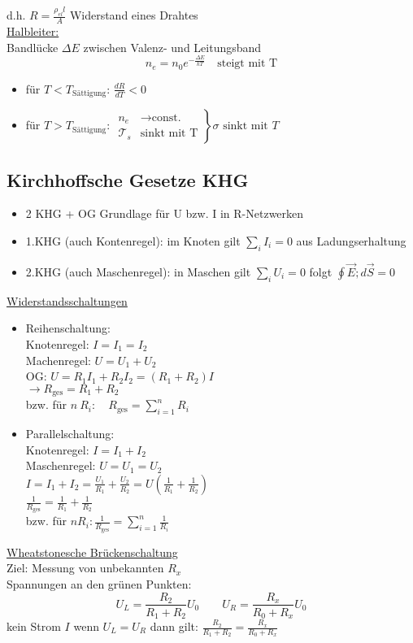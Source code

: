 \documentclass[titlepage,12pt,a4paper,ngerman]{report}
\newcommand{\tx}[1]{\textrm{#1}}
\begin{document}

d.h. $\boxed{ R = \frac{\rho_{el} l}{A}}$ Widerstand eines Drahtes\\
\underline{Halbleiter:}\\
Bandlücke $ \Delta E $ zwischen Valenz- und Leitungsband 
$$n_e = n_0 e^{-\frac{\Delta E}{k T}} \quad \tx{steigt mit T}$$
\begin{itemize}
	\item für $ T<T_{\tx{Sättigung}} $: $ \frac{dR}{dT} <0$
	\item für $ T>T_{\tx{Sättigung}} $: $ \left. \begin{array}{ll}
	n_e & \rightarrow \tx{const.} \\ \mathcal{T}_s & \tx{sinkt mit T}
	\end{array} \right\}  
	\sigma \tx{ sinkt mit } T$
\end{itemize}

\subsection{Kirchhoffsche Gesetze KHG}
\begin{itemize}
	\item 2 KHG + OG Grundlage für U bzw. I in R-Netzwerken
	\item 1.KHG (auch Kontenregel): im Knoten gilt $ \sum_i I_i = 0 $ aus Ladungserhaltung
	\item 2.KHG (auch Maschenregel): in Maschen gilt $ \sum_i U_i = 0 $ folgt $ \oint \vec{E} ; d\vec{S} = 0 $
\end{itemize}
\underline{Widerstandsschaltungen}
\begin{itemize}
	\item Reihenschaltung:\\
	Knotenregel: $ I = I_1 = I_2 $\\
	Machenregel: $ U = U_1 + U_2 $\\
	OG: $ U = R_1 I_1 + R_2 I_2 = (R_1 +R_2) I $\\
	$ \rightarrow R_{\tx{ges}} = R_1 + R_2 $\\
	bzw. für $ n\ R_i: \quad R_{\tx{ges}} = \sum_{i=1}^{n} R_i $
	\item Parallelschaltung:\\
	Knotenregel: $ I = I_1 +I_2 $\\
	Maschenregel: $ U = U_1 = U_2 $\\
	$I = I_1 + I_2 = \frac{U_1}{R_1} + \frac{U_2}{R_2} = U (\frac{1}{R_1}+\frac{1}{R_2})$\\
	$ \frac{1}{R_{\tx{ges}}} = \frac{1}{R_1} + \frac{1}{R_2} $\\
	bzw. für $ n R_i: \frac{1}{R_{\tx{ges}}} = \sum_{i=1}^{n}  \frac{1}{R_i}$
\end{itemize}
\underline{Wheatstonesche Brückenschaltung}\\
Ziel: Messung von unbekannten $ R_x $\\
Spannungen an den grünen Punkten:
$$U_L = \frac{R_2}{R_1 + R_2} U_0 \qquad U_R = \frac{R_x}{R_0 + R_x} U_0 $$
kein Strom $I$ wenn $ U_L = U_R $ dann gilt: $ \frac{R_2}{R_1+R_2} = \frac{R_x}{R_0 + R_x} $
\end{document}
